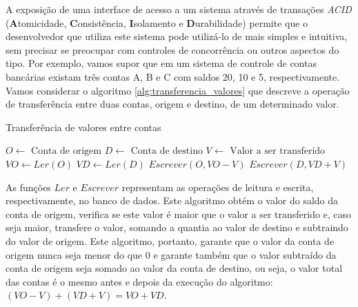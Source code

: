 \documentclass[11pt,twoside,a4paper]{book}
\begin{document}

A exposição de uma interface de acesso a um sistema através de transações \emph{ACID} (\textbf{A}tomicidade, \textbf{C}onsistência, \textbf{I}solamento e \textbf{D}urabilidade) permite que o desenvolvedor que utiliza este sistema pode utilizá-lo de mais simples e intuitiva, sem precisar se preocupar com controles de concorrência ou outros aspectos do tipo. Por exemplo, vamos supor que em um sistema de controle de contas bancárias existam três contas A, B e C com saldos 20, 10 e 5, respectivamente. Vamos considerar o algoritmo \ref{alg:transferencia_valores} que descreve a operação de transferência entre duas contas, origem e destino, de um determinado valor.

\begin{algorithm}
\caption{Transferência de valores entre contas}
\label{alg:transferencia_valores}
\begin{algorithmic}[1]
\State $O \gets \text{ Conta de origem}$
\State $D \gets \text{ Conta de destino}$
\State $V \gets \text{ Valor a ser transferido}$
\State $VO \gets Ler(O)$
	\State $VD \gets Ler(D)$
	\State $Escrever(O, VO - V)$
	\State $Escrever(D, VD + V)$
\EndIf
\end{algorithmic}
\end{algorithm}

As funções $Ler$ e $Escrever$ representam as operações de leitura e escrita, respectivamente, no banco de dados. Este algoritmo obtém o valor do saldo da conta de origem, verifica se este valor é maior que o valor a ser transferido e, caso seja maior, transfere o valor, somando a quantia ao valor de destino e subtraindo do valor de origem. Este algoritmo, portanto, garante que o valor da conta de origem nunca seja menor do que 0 e garante também que o valor subtraído da conta de origem seja somado ao valor da conta de destino, ou seja, o valor total das contas é o mesmo antes e depois da execução do algoritmo: $(VO - V) + (VD + V) = VO + VD$.
\end{document}
